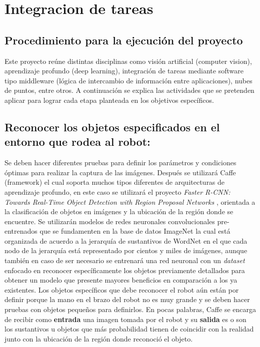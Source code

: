 \chapter{Integracion de tareas }
\label{ch:solucion}




\section*{Procedimiento para la ejecución del proyecto}

Este proyecto reúne distintas disciplinas como visión artificial (computer vision), aprendizaje profundo 
(deep learning), integración de tareas mediante software tipo middleware (lógica de intercambio de información
entre aplicaciones), nubes de puntos, entre otros. A continuación se explica las actividades que se pretenden 
aplicar para lograr cada etapa planteada en los objetivos específicos.


\section{Reconocer los objetos especificados en el entorno que rodea al robot:}
Se deben hacer diferentes pruebas
para definir los parámetros y condiciones óptimas para realizar la captura de las imágenes. Después se utilizará
Caffe (framework) el cual soporta muchos tipos diferentes de arquitecturas de aprendizaje profundo, en este caso
se utilizará el proyecto \textit{Faster R-CNN: Towards Real-Time Object Detection with Region Proposal Networks}
\cite{renNIPS15fasterrcnn}, orientada a la clasificación de objetos en imágenes y la ubicación de la región donde
se encuentre. Se utilizarán modelos de redes neuronales convolucionales pre-entrenados que se fundamenten en la
base de datos ImageNet la cual está organizada de acuerdo a la jerarquía de sustantivos de WordNet en el que cada
nodo de la jerarquía está representado por cientos y miles de imágenes, aunque también en caso de ser necesario 
se entrenará una red neuronal con un \textit{dataset} enfocado en reconocer específicamente los objetos previamente 
detallados para obtener un modelo que presente mayores beneficios en comparación a los ya existentes. Los objetos 
específicos que debe reconocer el robot aún están por definir porque la mano en el brazo del robot no es muy grande
y se deben hacer pruebas con objetos pequeños para definirlos. En pocas palabras, Caffe se encarga de recibir como
\textbf{entrada} una imagen tomada por el robot y su \textbf{salida} es o son los sustantivos u objetos que más 
probabilidad tienen de coincidir con la realidad junto con la ubicación de la región donde reconoció el objeto. 
 
